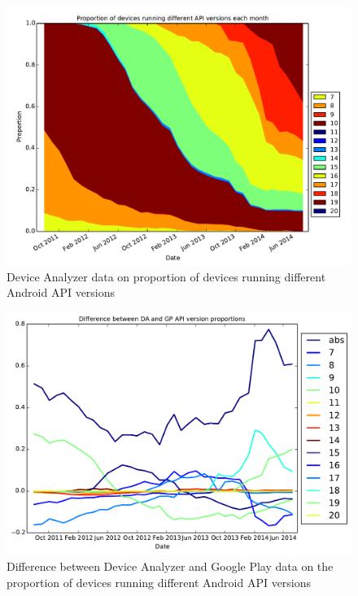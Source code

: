 \documentclass[conference,a4paper,twoside]{IEEEtran}
\begin{document}
\begin{figure}
 \centering
 \includegraphics[width=\columnwidth]{figures/norm_api_gpcomp}
 \caption{Device Analyzer data on proportion of devices running different Android API versions}
 \label{fig:da_api}
\end{figure}
\begin{figure}
 \centering
 \includegraphics[width=\columnwidth]{figures/api_gpcomp_diff}
 \caption{Difference between Device Analyzer and Google Play data on the proportion of devices running different Android API versions}
 \label{fig:da_gp_comp_diff}
\end{figure}
\end{document}
